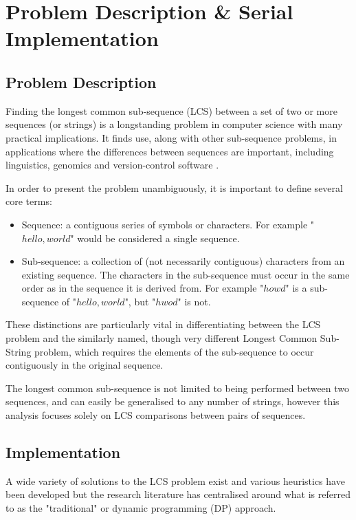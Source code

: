 
\chapter{Problem Description \& Serial Implementation}

\section{Problem Description}

Finding the longest common sub-sequence (LCS) between a set of two or more sequences (or strings) is a longstanding problem in computer science with many practical implications. It finds use, along with other sub-sequence problems, in applications where the differences between sequences are important, including linguistics, genomics and version-control software \cite{survey}.

In order to present the problem unambiguously, it is important to define several core terms:
\vspace{-1em}
\begin{itemize}
    \item Sequence: a contiguous series of symbols or characters. For example "$hello,world$" would be considered a single sequence.
    \item Sub-sequence: a collection of (not necessarily contiguous) characters from an existing sequence. The characters in the sub-sequence must occur in the same order as in the sequence it is derived from. For example "$howd$" is a sub-sequence of "$hello,world$", but "$hwod$" is not.
\end{itemize}

These distinctions are particularly vital in differentiating between the LCS problem and the similarly named, though very different Longest Common Sub-String problem, which requires the elements of the sub-sequence to occur contiguously in the original sequence.

The longest common sub-sequence is not limited to being performed between two sequences, and can easily be generalised to any number of strings, however this analysis focuses solely on LCS comparisons between pairs of sequences.

\section{Implementation} 
A wide variety of solutions to the LCS problem exist and various heuristics have been developed but the research literature has centralised around what is referred to as the "traditional" or dynamic programming (DP) approach.

